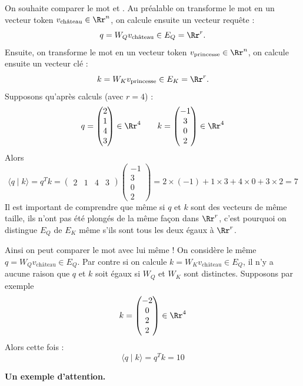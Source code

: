 \documentclass[11pt,class=report,crop=false]{standalone}
\begin{document}
\begin{exemple}
On souhaite comparer le mot  et .
Au préalable on transforme le mot  en un vecteur token $v_{\text{château}} \in \Rr^n$,
on calcule ensuite un vecteur requête : 
$$q = W_Q v_{\text{château}} \in E_Q = \Rr^r.$$
Ensuite, on transforme le mot  en un vecteur token $v_{\text{princesse}} \in \Rr^n$,
on calcule ensuite un vecteur clé : 
$$k = W_K v_{\text{princesse}} \in E_K = \Rr^r.$$
Supposons qu'après calculs (avec $r=4$) :
$$
q = \begin{pmatrix} 2 \\ 1 \\ 4 \\ 3 \end{pmatrix} \in \Rr^4
\qquad
k =  \begin{pmatrix} -1 \\ 3 \\ 0 \\ 2 \end{pmatrix} \in \Rr^4
$$
Alors 
$$
\langle q \mid k \rangle = q^T k = 
\begin{pmatrix} 2 & 1 & 4 & 3 \end{pmatrix}
\begin{pmatrix} -1 \\ 3 \\ 0 \\ 2 \end{pmatrix}
= 2 \times (-1) + 1 \times 3 + 4 \times 0 + 3 \times 2 = 7 
$$
Il est important de comprendre que même si $q$ et $k$ sont des vecteurs de même taille, ils n'ont pas été plongés de la même façon dans $\Rr^r$, c'est pourquoi on distingue $E_Q$ de $E_K$ même s'ils sont tous les deux égaux à $\Rr^r$.

Ainsi on peut comparer le mot  avec lui même ! 
On considère le même $q = W_Q v_{\text{château}} \in E_Q$.
Par contre si on calcule $k = W_K v_{\text{château}} \in E_Q$, il n'y a aucune raison que $q$ et $k$ soit égaux si $W_Q$ et $W_K$ sont distinctes.
Supposons par exemple 
$$
k =  \begin{pmatrix} -2 \\ 0 \\ 2 \\ 2 \end{pmatrix} \in \Rr^4
$$
Alors cette fois :
$$
\langle q \mid k \rangle = q^T k = 10
$$
\end{exemple}

\bigskip

\textbf{Un exemple d'attention.}
\end{document}
